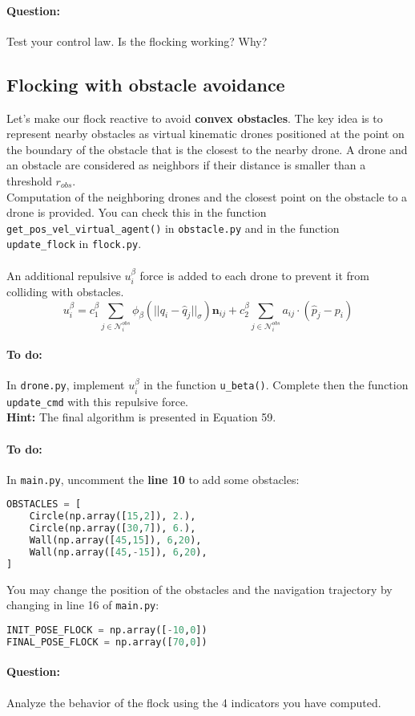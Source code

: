 \documentclass{article}
\begin{document}
\paragraph{Question:} Test your control law. Is the flocking working? Why?

\subsection{Flocking with obstacle avoidance}
Let's make our flock reactive to avoid \textbf{convex obstacles}. The key idea is to represent nearby obstacles as virtual kinematic drones positioned at the point on the boundary of the obstacle that is the closest to the nearby drone. A drone and an obstacle are considered as neighbors if their distance is smaller than a threshold $r_{obs}$.\\
Computation of the neighboring drones and the closest point on the obstacle to a drone is provided. You can check this in the function \texttt{get\_pos\_vel\_virtual\_agent()} in \texttt{obstacle.py} and in the function \texttt{update\_flock} in \texttt{flock.py}.\\ \\
An additional repulsive $u_i^{\beta}$ force is added to each drone to prevent it from colliding with obstacles.
$$
u_i^{\beta} = c_1^{\beta} \sum_{j\in \mathcal{N}_i^{obs}}\phi_\beta(||q_i - \widehat{q}_j||_\sigma)\mathbf{n}_{ij} + c_2^{\beta} \sum_{j\in \mathcal{N}_i^{obs}}a_{ij} \cdot (\widehat{p}_j-p_i)
$$

\paragraph{To do:}
In \texttt{drone.py}, implement $u_i^\beta$ in the function \texttt{u\_beta()}. Complete then the function \texttt{update\_cmd} with this repulsive force.\\
\textbf{Hint:} The final algorithm is presented in Equation 59.

\paragraph{To do:}
In \texttt{main.py}, uncomment the \textbf{line 10} to add some obstacles:
\begin{lstlisting}[language=python, frame=single]
OBSTACLES = [
    Circle(np.array([15,2]), 2.),
    Circle(np.array([30,7]), 6.),
    Wall(np.array([45,15]), 6,20),
    Wall(np.array([45,-15]), 6,20),
]
\end{lstlisting}
You may change the position of the obstacles and the navigation trajectory by changing in line 16 of \texttt{main.py}:
\begin{lstlisting}[language=python, frame=single]
INIT_POSE_FLOCK = np.array([-10,0])
FINAL_POSE_FLOCK = np.array([70,0])
\end{lstlisting}

\paragraph{Question:} Analyze the behavior of the flock using the 4 indicators you have computed.
\end{document}
